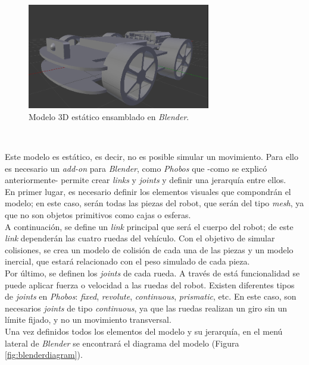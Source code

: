 \begin{figure} [h!]
	\begin{center}
		\includegraphics[width=8cm]{figs/blenderModel}
	\end{center}
	\caption{Modelo 3D estático ensamblado en \textit{Blender}.}
	\label{fig:blendermodel}
\end{figure}\

Este modelo es estático, es decir, no es posible simular un movimiento. Para ello es necesario un \textit{add-on} para \textit{Blender}, como \textit{Phobos} que -como se explicó anteriormente- permite crear \textit{links} y \textit{joints} y definir una jerarquía entre ellos.\\

En primer lugar, es necesario definir los elementos visuales que compondrán el modelo; en este caso, serán todas las piezas del robot, que serán del tipo \textit{mesh}, ya que no son objetos primitivos como cajas o esferas.\\

A continuación, se define un \textit{link} principal que será el cuerpo del robot; de este \textit{link} dependerán las cuatro ruedas del vehículo. Con el objetivo de simular colisiones, se crea un modelo de colisión de cada una de las piezas y un modelo inercial, que estará relacionado con el peso simulado de cada pieza.\\

Por último, se definen los \textit{joints} de cada rueda. A través de está funcionalidad se puede aplicar fuerza o velocidad a las ruedas del robot. Existen diferentes tipos de
\textit{joints} en \textit{Phobos}: \textit{fixed}, \textit{revolute}, \textit{continuous}, \textit{prismatic}, etc. En este caso, son necesarios \textit{joints} de tipo \textit{continuous}, ya que las ruedas realizan un giro sin un límite fijado, y no un movimiento transversal.\\

Una vez definidos todos los elementos del modelo y su jerarquía, en el menú lateral de \textit{Blender} se encontrará el diagrama del modelo (Figura \ref{fig:blenderdiagram}).\\

